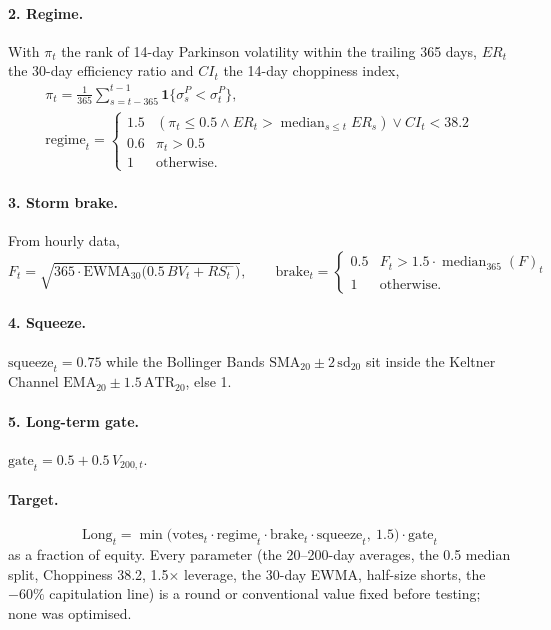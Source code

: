 \documentclass[11pt,a4paper]{article}
\theoremstyle{definition}
\begin{document}
\paragraph{2. Regime.} With $\pi_t$ the rank of 14-day Parkinson volatility within the trailing 365 days, $ER_t$ the 30-day efficiency ratio and $CI_t$ the 14-day choppiness index,
\begin{gather}
\pi_t=\frac{1}{365}\sum_{s=t-365}^{t-1}\mathbf 1\{\sigma^P_s<\sigma^P_t\},\\
\text{regime}_t=\begin{cases}1.5 & (\pi_t\le0.5\wedge ER_t>\operatorname{median}_{s\le t}ER_s)\vee CI_t<38.2\\0.6 & \pi_t>0.5\\1 & \text{otherwise.}\end{cases}
\end{gather}

\paragraph{3. Storm brake.} From hourly data,
\begin{equation}
F_t=\sqrt{365\cdot\mathrm{EWMA}_{30}\bigl(0.5\,BV_t+RS^-_t\bigr)},\qquad\text{brake}_t=\begin{cases}0.5 & F_t>1.5\cdot\operatorname{median}_{365}(F)_t\\1&\text{otherwise.}\end{cases}
\end{equation}

\paragraph{4. Squeeze.} $\text{squeeze}_t=0.75$ while the Bollinger Bands $\mathrm{SMA}_{20}\pm2\,\mathrm{sd}_{20}$ sit inside the Keltner Channel $\mathrm{EMA}_{20}\pm1.5\,\mathrm{ATR}_{20}$, else 1.

\paragraph{5. Long-term gate.} $\text{gate}_t=0.5+0.5\,V_{200,t}$.

\paragraph{Target.}
\begin{equation}
\boxed{\ \text{Long}_t=\min\bigl(\text{votes}_t\cdot\text{regime}_t\cdot\text{brake}_t\cdot\text{squeeze}_t,\ 1.5\bigr)\cdot\text{gate}_t\ }
\end{equation}
as a fraction of equity. Every parameter (the 20--200-day averages, the 0.5 median split, Choppiness 38.2, 1.5$\times$ leverage, the 30-day EWMA, half-size shorts, the $-60\%$ capitulation line) is a round or conventional value fixed before testing; none was optimised.
\end{document}
